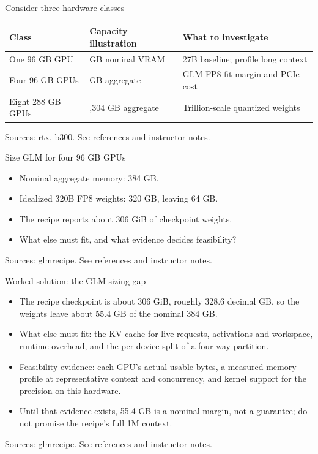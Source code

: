 \documentclass[aspectratio=169,11pt]{beamer}
\begin{document}
\begin{frame}[t,fragile]{Consider three hardware classes}
\fontsize{10.5}{12.5}\selectfont\setlength{\tabcolsep}{4pt}\renewcommand{\arraystretch}{1.15}
\begin{tabular}{>{\raggedright\arraybackslash}p{}>{\raggedright\arraybackslash}p{}>{\raggedright\arraybackslash}p{}}
\toprule
\textbf{Class} & \textbf{Capacity illustration} & \textbf{What to investigate} \\ \midrule
One 96 GB GPU & 96 GB nominal VRAM & 27B baseline; profile long context \\[2pt]
Four 96 GB GPUs & 384 GB aggregate & GLM FP8 fit margin and PCIe cost \\[2pt]
Eight 288 GB GPUs & 2,304 GB aggregate & Trillion-scale quantized weights \\[2pt]
\bottomrule\end{tabular}\par\vspace{2mm}
\vfill{\fontsize{6.5}{8}\selectfont\color{UTgray} Sources: rtx, b300. See references and instructor notes.\par}
\end{frame}
\begin{frame}[t,fragile]{Size GLM for four 96 GB GPUs}
\fontsize{11.5}{14}\selectfont
\begin{itemize}\setlength{\itemsep}{2mm}
\item Nominal aggregate memory: 384 GB.
\item Idealized 320B FP8 weights: 320 GB, leaving 64 GB.
\item The recipe reports about 306 GiB of checkpoint weights.
\item What else must fit, and what evidence decides feasibility?
\end{itemize}
\vfill{\fontsize{6.5}{8}\selectfont\color{UTgray} Sources: glmrecipe. See references and instructor notes.\par}
\end{frame}
\begin{frame}[t,fragile]{Worked solution: the GLM sizing gap}
\fontsize{11.5}{14}\selectfont
\begin{itemize}\setlength{\itemsep}{2mm}
\item The recipe checkpoint is about 306 GiB, roughly 328.6 decimal GB, so the weights leave about 55.4 GB of the nominal 384 GB.
\item What else must fit: the KV cache for live requests, activations and workspace, runtime overhead, and the per-device split of a four-way partition.
\item Feasibility evidence: each GPU's actual usable bytes, a measured memory profile at representative context and concurrency, and kernel support for the precision on this hardware.
\item Until that evidence exists, 55.4 GB is a nominal margin, not a guarantee; do not promise the recipe's full 1M context.
\end{itemize}
\vfill{\fontsize{6.5}{8}\selectfont\color{UTgray} Sources: glmrecipe. See references and instructor notes.\par}
\end{frame}
\end{document}
